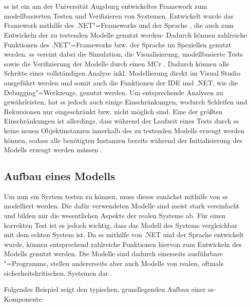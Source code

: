 \section{}
\label{sec:ssharp}

\gls{ss} ist ein am \isse der Universität Augsburg entwickeltes Framework zum modellbasierten Testen und Verifizieren von Systemen.
Entwickelt wurde das Framework mithilfe des .NET"=Frameworks und der Sprache \cS, die auch zum Entwickeln der zu testenden Modelle genutzt werden-
Dadurch können zahlreiche Funktionen des .NET"=Frameworks bzw. der Sprache \cS im Speziellen genutzt werden.
\gls{ss} vereint dabei die Simulation, die Visualisierung, modellbasierte \glspl{Test} sowie die Verifizierung der Modelle durch einen \gls{MCr} \cite{Habermaier2015,Habermaier2016}.
Dadurch können alle Schritte einer vollständigen Analyse inkl. Modellierung direkt im Visual Studio ausgeführt werden und somit auch die Funktionen der IDE und .NET, wie \zB die Debugging"=Werkzeuge, genutzt werden.
Um entsprechende Analysen zu gewährleisten, hat \gls{ss} jedoch auch einige Einschränkungen, wodurch \zB Schleifen und Rekursionen nur eingeschränkt bzw. nicht möglich sind.
Eine der größten Einschränkungen ist allerdings, dass während der Laufzeit eines Tests durch \gls{ss} keine neuen Objektinstanzen innerhalb des zu testenden Modells erzeugt werden können, sodass alle benötigten Instanzen bereits während der Initialisierung des Modells erzeugt werden müssen \cite{Habermaier2015}.

\subsection{Aufbau eines Modells}
\label{subsec:ssharpModel}

Um nun ein System testen zu können, muss dieses zunächst mithilfe von \gls{ss} modelliert werden.
Die dafür verwendeten Modelle sind meist stark vereinfacht und bilden nur die wesentlichen Aspekte der realen Systeme ab.
Für einen korrekten Test ist es jedoch wichtig, dass das Modell des Systems vergleichbar mit dem echten System ist.
Da \gls{ss} mithilfe von .NET und der Sprache \cS entwickelt wurde, können entsprechend zahlreiche Funktionen hiervon zum Entwickeln des Modells genutzt werden.
Die Modelle sind dadurch einerseits ausführbare \cS"=Programme, stellen andererseits aber auch Modelle von realen, oftmals sicherheitskritischen, Systemen dar \cite{Habermaier2016}.

Folgendes Beispiel zeigt den typischen, grundlegenden Aufbau einer \gls{ss}-Komponente:

